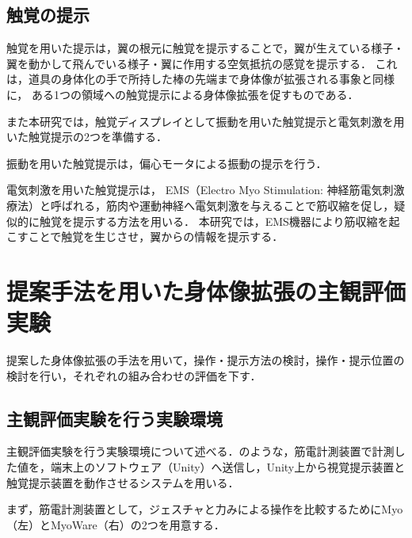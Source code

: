 \begin{small}
    \subsection{触覚の提示} %
      触覚を用いた提示は，翼の根元に触覚を提示することで，翼が生えている様子・翼を動かして飛んでいる様子・翼に作用する空気抵抗の感覚を提示する．
      これは，道具の身体化の手で所持した棒の先端まで身体像が拡張される事象と同様に，
      ある1つの領域への触覚提示による身体像拡張を促すものである．
      
      また本研究では，触覚ディスプレイとして振動を用いた触覚提示と電気刺激を用いた触覚提示の2つを準備する．
      
      振動を用いた触覚提示は，偏心モータによる振動の提示を行う．
  
      電気刺激を用いた触覚提示は，
      EMS（Electro Myo Stimulation: 神経筋電気刺激療法）と呼ばれる，筋肉や運動神経へ電気刺激を与えることで筋収縮を促し，疑似的に触覚を提示する方法を用いる．
      本研究では，EMS機器により筋収縮を起こすことで触覚を生じさせ，翼からの情報を提示する．


\section{提案手法を用いた身体像拡張の主観評価実験}
  提案した身体像拡張の手法を用いて，操作・提示方法の検討，操作・提示位置の検討を行い，それぞれの組み合わせの評価を下す．

  \subsection{主観評価実験を行う実験環境}
    
    主観評価実験を行う実験環境について述べる．のような，筋電計測装置で計測した値を，端末上のソフトウェア（Unity）へ送信し，Unity上から視覚提示装置と触覚提示装置を動作させるシステムを用いる．



    まず，筋電計測装置として，ジェスチャと力みによる操作を比較するためにMyo（左）とMyoWare（右）の2つを用意する．


\end{small}
